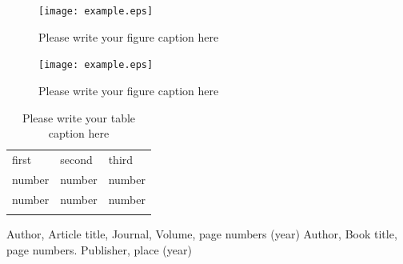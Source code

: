 \begin{figure}
  \texttt{[image: example.eps]}
\caption{Please write your figure caption here}
\label{fig:1}       %
\end{figure}
%
\begin{figure}
  \texttt{[image: example.eps]}
\caption{Please write your figure caption here}
\label{fig:2}       %
\end{figure}
%
\begin{table}
\caption{Please write your table caption here}
\label{tab:1}       %
\begin{tabular}{lll}
\hline\noalign{\smallskip}
first & second & third  \\
\noalign{\smallskip}\hline\noalign{\smallskip}
number & number & number \\
number & number & number \\
\noalign{\smallskip}\hline
\end{tabular}
\end{table}




%
%



\begin{thebibliography}{}
%
%
Author, Article title, Journal, Volume, page numbers (year)
Author, Book title, page numbers. Publisher, place (year)
\end{thebibliography}



